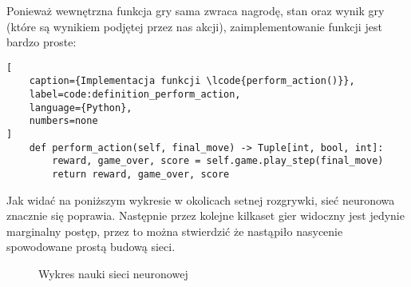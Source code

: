 \clearpage

Ponieważ wewnętrzna funkcja  gry sama zwraca nagrodę, stan oraz wynik gry (które są wynikiem podjętej przez nas akcji), zaimplementowanie funkcji  jest bardzo proste:


\begin{onepage}
    \begin{lstlisting}[
    caption={Implementacja funkcji \lcode{perform_action()}},
    label=code:definition_perform_action,
    language={Python},
    numbers=none
]
    def perform_action(self, final_move) -> Tuple[int, bool, int]:
        reward, game_over, score = self.game.play_step(final_move)
        return reward, game_over, score
    \end{lstlisting}
\end{onepage}

Jak widać na poniższym wykresie w okolicach setnej rozgrywki, sieć neuronowa znacznie się poprawia. Następnie przez kolejne kilkaset gier widoczny jest jedynie marginalny postęp, przez to można stwierdzić że nastąpiło nasycenie spowodowane prostą budową sieci.

\begin{figure}[h]
    \centering
    \caption{Wykres nauki sieci neuronowej}
    \label{img:ai_graph}
\end{figure}
